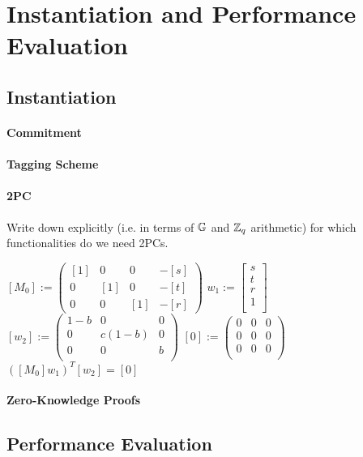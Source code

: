 
\section{Instantiation and Performance Evaluation}

\subsection{Instantiation}

\paragraph{Commitment}

\paragraph{Tagging Scheme}

\paragraph{2PC}

\begin{todobox}
    Write down explicitly (i.e. in terms of $\mathbb{G}$ and $\mathbb{Z}_q$ arithmetic) for which functionalities do we need 2PCs.     
\end{todobox}


$[M_0] := \begin{pmatrix}
[1] & 0 & 0 & -[s] \\
0 & [1] & 0 & -[t] \\
0 & 0 & [1] & -[r]
\end{pmatrix} $
$w_1 := \begin{bmatrix} s \\ t \\ r \\ 1 \\ \end{bmatrix}$
$[w_2] := \begin{pmatrix}
1-b & 0 & 0 \\
0 & c(1-b) & 0 \\
0 & 0 & b \\
\end{pmatrix}$
$[0] :=
\begin{pmatrix}
0 & 0 & 0 \\
0 & 0 & 0 \\
0 & 0 & 0 \\
\end{pmatrix} $
$([M_0]w_1)^T[w_2] = [0]$

\paragraph{Zero-Knowledge Proofs}

\subsection{Performance Evaluation}

